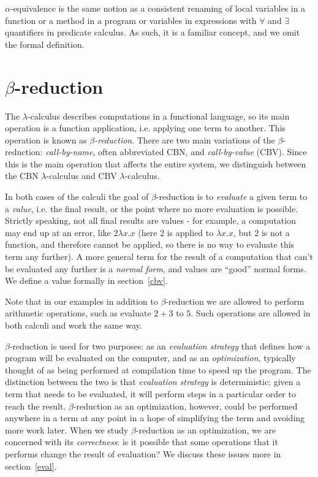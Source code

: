 \documentclass{article}
\newcommand{\lam}{\lambda}
\begin{document}
$\alpha$-equivalence is the same notion as a consistent renaming of local variables in a function or a method in a program or variables in expressions with $\forall$ and $\exists$ quantifiers in predicate calculus. As such, it is a familiar concept, and we omit the formal definition. 

\section{$\beta$-reduction}
The $\lam$-calculus describes computations in a functional language, so its main operation is a function application, i.e. applying one term to another. This operation is known as \textit{$\beta$-reduction}. There are two main variations of the $\beta$-reduction: \textit{call-by-name}, often abbreviated CBN, and \textit{call-by-value} (CBV). Since this is the main operation that affects the entire system, we distinguish between the CBN $\lam$-calculus and CBV $\lam$-calculus. 

In both cases of the calculi the goal of $\beta$-reduction is to \textit{evaluate} a given term to a \textit{value}, i.e. the final result, or the point where no more evaluation is possible. 
Strictly speaking, not all final results are values - for example, a computation may end up at an error, like $2 \lam x. x$ (here $2$ is applied to $\lam x. x$, but $2$ is not a function, and therefore cannot be applied, so there is no way to evaluate this term any further). A more general term for the result of a computation that can't be evaluated any further is a \textit{normal form}, and values are ``good'' normal forms. 
We define a value formally in section~\ref{cbv}. 

Note that in our examples in addition to $\beta$-reduction we are allowed to perform arithmetic operations, such as evaluate $2 + 3$ to $5$. Such operations are allowed in both calculi and work the same way. 

$\beta$-reduction is used for two purposes: as an \textit{evaluation strategy} that defines how a program will be evaluated on the computer, and as an \textit{optimization}, typically thought of as being performed at compilation time to speed up the program. The distinction between the two is that \textit{evaluation strategy} is deterministic: given a term that needs to be evaluated, it will perform steps in a particular order to reach the result. $\beta$-reduction as an optimization, however, could be performed anywhere in a term at any point in a hope of simplifying the term and avoiding more work later. When we study $\beta$-reduction as an optimization, we are concerned with its \textit{correctness}: is it possible that some operations that it performs change the result of evaluation? We discuss these issues more in section~\ref{eval}.
\end{document}
